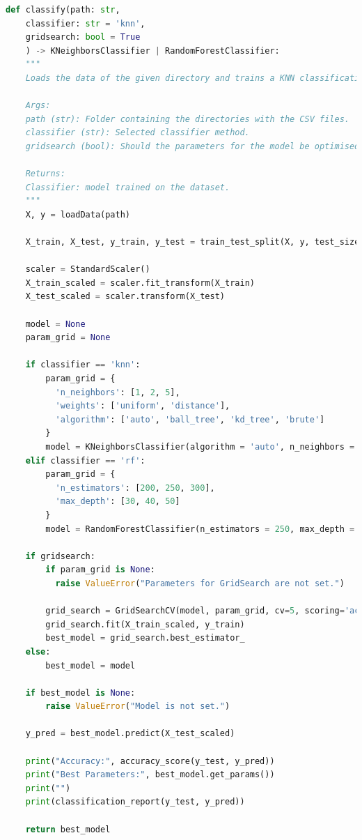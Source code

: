 \documentclass[11pt,
  oneside,openany,    %
]{scrreprt}
\begin{document}
\begin{lstlisting}[language=python, caption=Classifier Function, label=lst:classifier]
def classify(path: str, 
    classifier: str = 'knn', 
    gridsearch: bool = True
    ) -> KNeighborsClassifier | RandomForestClassifier:
    """
    Loads the data of the given directory and trains a KNN classification algorithm, then tests the accuracy. 

    Args:
    path (str): Folder containing the directories with the CSV files.
    classifier (str): Selected classifier method.
    gridsearch (bool): Should the parameters for the model be optimised via gridsearch or use default ones.

    Returns:
    Classifier: model trained on the dataset.
    """
    X, y = loadData(path)

    X_train, X_test, y_train, y_test = train_test_split(X, y, test_size=0.3, random_state=42)

    scaler = StandardScaler()
    X_train_scaled = scaler.fit_transform(X_train)
    X_test_scaled = scaler.transform(X_test)

    model = None
    param_grid = None

    if classifier == 'knn':
        param_grid = {
          'n_neighbors': [1, 2, 5],
          'weights': ['uniform', 'distance'],
          'algorithm': ['auto', 'ball_tree', 'kd_tree', 'brute']
        }
        model = KNeighborsClassifier(algorithm = 'auto', n_neighbors = 1, weights = 'uniform')
    elif classifier == 'rf':
        param_grid = {
          'n_estimators': [200, 250, 300], 
          'max_depth': [30, 40, 50]
        }
        model = RandomForestClassifier(n_estimators = 250, max_depth = 40)

    if gridsearch:    
        if param_grid is None:
          raise ValueError("Parameters for GridSearch are not set.")

        grid_search = GridSearchCV(model, param_grid, cv=5, scoring='accuracy')
        grid_search.fit(X_train_scaled, y_train)
        best_model = grid_search.best_estimator_
    else:
        best_model = model

    if best_model is None:
        raise ValueError("Model is not set.")

    y_pred = best_model.predict(X_test_scaled)

    print("Accuracy:", accuracy_score(y_test, y_pred))
    print("Best Parameters:", best_model.get_params())
    print("")
    print(classification_report(y_test, y_pred))

    return best_model
\end{lstlisting}
\end{document}
